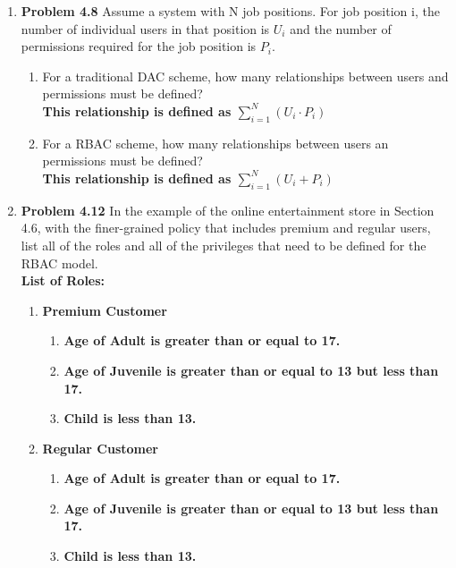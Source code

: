 \documentclass[12pt]{article}
\begin{document}
\begin{enumerate}
\item \textbf{Problem 4.8} Assume a system with N job positions. For job position i, the number of individual users in that position is $U_{i}$ and the number of permissions required for the job position is $P_i$.
  \begin{enumerate}
    \item For a traditional DAC scheme, how many relationships between users and permissions must be defined? \\

    \textbf{This relationship is defined as $\sum_{i=1}^N (U_i \cdot P_i)$}\\

    \item For a RBAC scheme, how many relationships between users an permissions must be defined? \\

    \textbf{This relationship is defined as $\sum_{i=1}^N (U_i + P_i)$}\\

  \end{enumerate}

\item \textbf{Problem 4.12} In the example of the online entertainment store in Section 4.6, with the finer-grained policy that includes premium and regular users, list all of the roles and all of the privileges that need to be defined for the RBAC model. \\

\textbf{List of Roles:}
\begin{enumerate}
  \item \textbf{Premium Customer}
  \begin{enumerate}
    \item \textbf{Age of Adult is greater than or equal to 17.} \\
    \item \textbf{Age of Juvenile is greater than or equal to 13 but less than 17.} \\
    \item \textbf{Child is less than 13.} \\
  \end{enumerate}
  \item \textbf{Regular Customer}
  \begin{enumerate}
    \item \textbf{Age of Adult is greater than or equal to 17.} \\
    \item \textbf{Age of Juvenile is greater than or equal to 13 but less than 17.} \\
    \item \textbf{Child is less than 13.} \\
  \end{enumerate}
\end{enumerate}


\end{enumerate}
\end{document}
